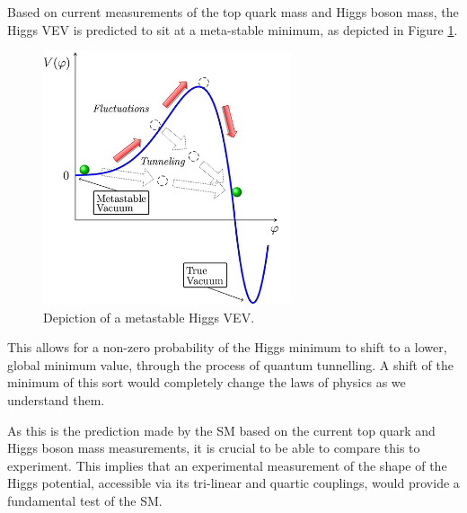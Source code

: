 Based on current measurements of the top quark mass and Higgs boson mass, the Higgs VEV is predicted to sit at a meta-stable minimum, as depicted in Figure \ref{fig:PossibilityToTunnel}. 

\begin{figure}[H]
    \centering
    \includegraphics[width=0.65\textwidth]{Images/Theory/HH_potential_Stability.png}
    \caption{Depiction of a metastable Higgs VEV.}
    \label{fig:PossibilityToTunnel}
\end{figure}

This allows for a non-zero probability of the Higgs minimum to shift to a lower, global minimum value, through the process of quantum tunnelling. A shift of the minimum of this sort would completely change the laws of physics as we understand them. 

As this is the prediction made by the SM based on the current top quark and Higgs boson mass measurements, it is crucial to be able to compare this to experiment. This implies that an experimental measurement of the shape of the Higgs potential, accessible via its tri-linear and quartic couplings, would provide a fundamental test of the SM. 